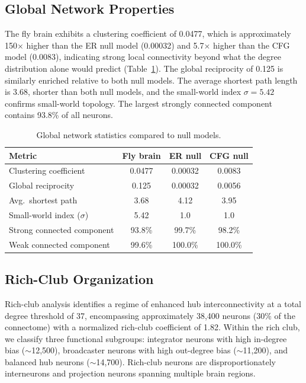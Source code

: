 \documentclass[11pt]{article}
\begin{document}
\subsection{Global Network Properties}
The fly brain exhibits a clustering coefficient of 0.0477, which is approximately 150$\times$ higher than the ER null model (0.00032) and 5.7$\times$ higher than the CFG model (0.0083), indicating strong local connectivity beyond what the degree distribution alone would predict (Table~\ref{tab:global}). The global reciprocity of 0.125 is similarly enriched relative to both null models. The average shortest path length is 3.68, shorter than both null models, and the small-world index $\sigma = 5.42$ confirms small-world topology. The largest strongly connected component contains 93.8\% of all neurons.

\begin{table}[h]
\centering
\caption{Global network statistics compared to null models.}
\label{tab:global}
\begin{tabular}{lccc}
\toprule
Metric & Fly brain & ER null & CFG null \\
\midrule
Clustering coefficient & 0.0477 & 0.00032 & 0.0083 \\
Global reciprocity & 0.125 & 0.00032 & 0.0056 \\
Avg.\ shortest path & 3.68 & 4.12 & 3.95 \\
Small-world index ($\sigma$) & 5.42 & 1.0 & 1.0 \\
Strong connected component & 93.8\% & 99.7\% & 98.2\% \\
Weak connected component & 99.6\% & 100.0\% & 100.0\% \\
\bottomrule
\end{tabular}
\end{table}

\subsection{Rich-Club Organization}
Rich-club analysis identifies a regime of enhanced hub interconnectivity at a total degree threshold of 37, encompassing approximately 38,400 neurons (30\% of the connectome) with a normalized rich-club coefficient of 1.82. Within the rich club, we classify three functional subgroups: integrator neurons with high in-degree bias ($\sim$12,500), broadcaster neurons with high out-degree bias ($\sim$11,200), and balanced hub neurons ($\sim$14,700). Rich-club neurons are disproportionately interneurons and projection neurons spanning multiple brain regions.
\end{document}
